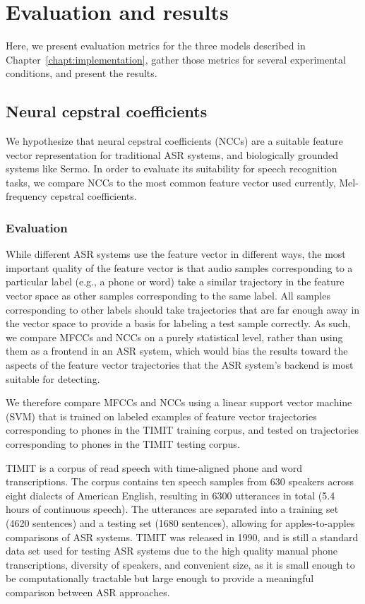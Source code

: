 \chapter{Evaluation and results}
\label{chapt:results}

Here,
we present evaluation metrics for the three models
described in Chapter~\ref{chapt:implementation},
gather those metrics
for several experimental conditions,
and present the results.

\section{Neural cepstral coefficients}

We hypothesize that
neural cepstral coefficients (NCCs)
are a suitable feature vector representation
for traditional ASR systems,
and biologically grounded systems like Sermo.
In order to evaluate
its suitability for speech recognition tasks,
we compare NCCs to the most common
feature vector used currently,
Mel-frequency cepstral coefficients.

\subsection{Evaluation}

While different ASR systems
use the feature vector in different ways,
the most important quality of the feature vector
is that audio samples corresponding
to a particular label
(e.g., a phone or word)
take a similar trajectory
in the feature vector space
as other samples corresponding to the same label.
All samples corresponding to other labels
should take trajectories that are
far enough away in the vector space
to provide a basis for labeling
a test sample correctly.
As such, we compare MFCCs and NCCs
on a purely statistical level,
rather than using them as a frontend
in an ASR system,
which would bias the results
toward the aspects of the
feature vector trajectories
that the ASR system's backend
is most suitable for detecting.

We therefore compare MFCCs and NCCs
using a linear support vector machine (SVM)
that is trained on labeled
examples of feature vector trajectories
corresponding to phones
in the TIMIT training corpus,
and tested on trajectories
corresponding to phones
in the TIMIT testing corpus.

TIMIT \citep{garofolo1993} is a corpus of read speech
with time-aligned phone and word transcriptions.
The corpus contains ten speech samples
from 630 speakers across eight dialects
of American English,
resulting in 6300 utterances in total
(5.4 hours of continuous speech).
The utterances are separated into
a training set
(4620 sentences) and a testing set (1680 sentences),
allowing for apples-to-apples
comparisons of ASR systems.
TIMIT was released in 1990,
and is still a standard data set used
for testing ASR systems
due to the high quality
manual phone transcriptions,
diversity of speakers,
and convenient size,
as it is small enough to be
computationally tractable
but large enough to
provide a meaningful comparison
between ASR approaches.

